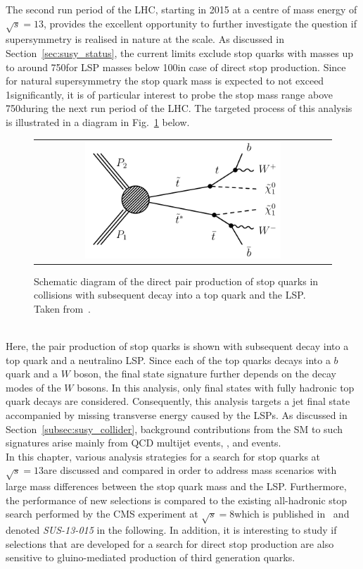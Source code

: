 The second run period of the LHC, starting in 2015 at a centre of mass energy of $\sqrt{s} = 13$\tev, provides the excellent opportunity to further investigate the question if supersymmetry is realised in nature at the \tev scale. As discussed in Section~\ref{sec:susy_status}, the current limits exclude stop quarks with masses up to around 750\gev for LSP masses below 100\gev in case of direct stop production. Since for natural supersymmetry the stop quark mass is expected to not exceed 1\tev significantly, it is of particular interest to probe the stop mass range above 750\gev during the next run period of the LHC. The targeted process of this analysis is illustrated in a diagram in Fig.~\ref{fig:T2tt} below.  
\begin{figure}[!h]
  \centering
  \begin{tabular}{c}
                \includegraphics[width=0.68\textwidth]{figures/T2tt.pdf} 
  \end{tabular}
  \caption{Schematic diagram of the direct pair production of stop quarks in \pp collisions with subsequent decay into a top quark and the LSP. Taken from~\cite{bib:CMS:PhysicsResultsSUS}. }
  \label{fig:T2tt}
\end{figure}
\\   
Here, the pair production of stop quarks is shown with subsequent decay into a top quark and a neutralino LSP. Since each of the top quarks decays into a $b$ quark and a $W$ boson, the final state signature further depends on the decay modes of the $W$ bosons. In this analysis, only final states with fully hadronic top quark decays are considered. Consequently, this analysis targets a jet final state accompanied by missing transverse energy caused by the LSPs. As discussed in Section~\ref{subsec:susy_collider}, background contributions from the SM to such signatures arise mainly from QCD multijet events, \WJets, \ZJets and \ttbar events. \\
In this chapter, various analysis strategies for a search for stop quarks at $\sqrt{s} = 13$\tev are discussed and compared in order to address mass scenarios with large mass differences between the stop quark mass and the LSP. Furthermore, the performance of new selections is compared to the existing all-hadronic stop search performed by the CMS experiment at $\sqrt{s} = 8$\tev which is published in~\cite{CMS-PAS-SUS-13-015} and denoted \textit{SUS-13-015} in the following. In addition, it is interesting to study if selections that are developed for a search for direct stop production are also sensitive to gluino-mediated production of third generation quarks. 

